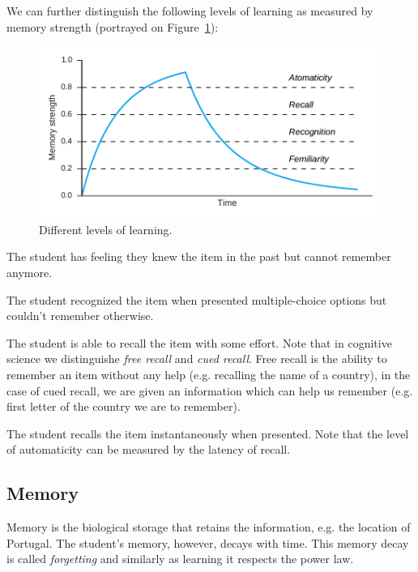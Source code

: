 We can further distinguish the following levels of learning as measured by memory strength (portrayed on Figure~\ref{fig:knowledge-levels}):

\begin{figure}[htbp]
  \centering
  \includegraphics[width=\textwidth]{img/knowledge-levels}
  \caption{Different levels of learning.}
  \label{fig:knowledge-levels}
\end{figure}

\begin{description}[leftmargin=0cm]
  \item[Familiarity] The student has feeling they knew the item in the past but cannot remember anymore.
  \item[Recognition] The student recognized the item when presented multiple-choice options but couldn't remember otherwise.
  \item[Recall] The student is able to recall the item with some effort. Note that in cognitive science we distinguishe \textit{free recall} and \textit{cued recall}. Free recall is the ability to remember an item without any help (e.g. recalling the name of a country), in the case of cued recall, we are given an information which can help us remember (e.g. first letter of the country we are to remember).
  \item[Automaticity] The student recalls the item instantaneously when presented. Note that the level of automaticity can be measured by the latency of recall.
\end{description}

\subsection{Memory}

Memory is the biological storage that retains the information, e.g. the location of Portugal. The student's memory, however, decays with time. This memory decay is called \textit{forgetting} and similarly as learning it respects the power law.


